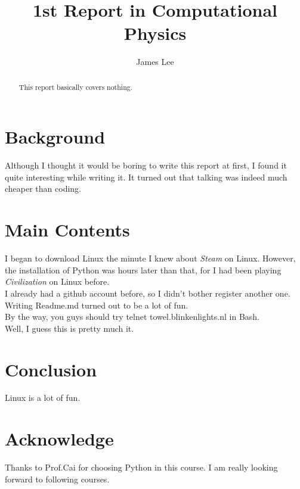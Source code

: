 \documentclass[10pt,a4paper]{article}
\author{James Lee}
\title{1st Report in Computational Physics}
\begin{document}
    \maketitle
    \begin{abstract}
    This report basically covers nothing.
    \end{abstract}
    \section{Background}
    Although I thought it would be boring to write this report at first, I found it quite interesting while writing it. It turned out that talking was indeed much cheaper than coding.
    \section{Main Contents}
    I began to download Linux the minute I knew about \emph{Steam} on Linux. However, the installation of Python was hours later than that, for I had been playing \emph{Civilization} on Linux before. \\
    I already had a github account before, so I didn't bother register another one. Writing Readme.md turned out to be a lot of fun.\\
    By the way, you guys should try telnet towel.blinkenlights.nl in Bash.\\
    Well, I guess this is pretty much it.\\ 
    \section{Conclusion}
    Linux is a lot of fun.
    \section{Acknowledge}
    Thanks to Prof.Cai for choosing Python in this course. I am really looking forward to following courses.
\end{document}
